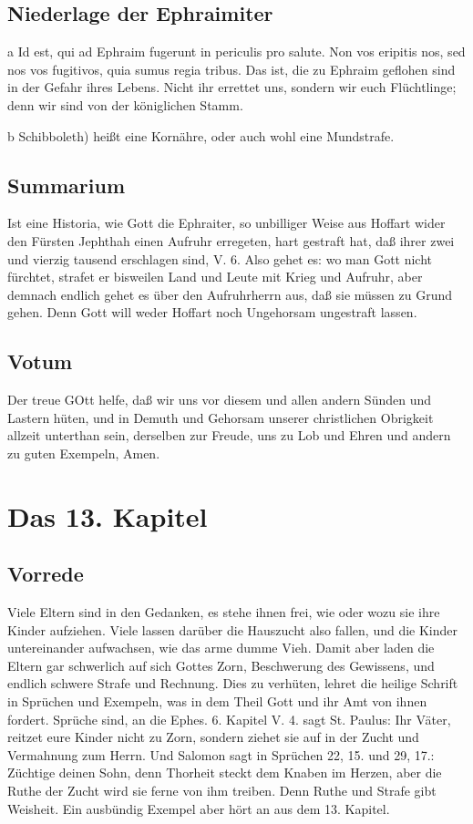 \section{Niederlage der Ephraimiter}

a Id est, qui ad Ephraim fugerunt in periculis pro salute. Non vos eripitis nos, sed nos vos fugitivos, quia sumus regia tribus. Das ist, die zu Ephraim geflohen sind in der Gefahr ihres Lebens. Nicht ihr errettet uns, sondern wir euch Flüchtlinge; denn wir sind von der königlichen Stamm.

b Schibboleth) heißt eine Kornähre, oder auch wohl eine Mundstrafe.

\section{Summarium}

Ist eine Historia, wie Gott die Ephraiter, so unbilliger Weise aus Hoffart wider den Fürsten Jephthah einen Aufruhr erregeten, hart gestraft hat, daß ihrer zwei und vierzig tausend erschlagen sind, V. 6. Also gehet es: wo man Gott nicht fürchtet, strafet er bisweilen Land und Leute mit Krieg und Aufruhr, aber demnach endlich gehet es über den Aufruhrherrn aus, daß sie müssen zu Grund gehen. Denn Gott will weder Hoffart noch Ungehorsam ungestraft lassen.

\section{Votum}

Der treue GOtt helfe, daß wir uns vor diesem und allen andern Sünden und Lastern hüten, und in Demuth und Gehorsam unserer christlichen Obrigkeit allzeit unterthan sein, derselben zur Freude, uns zu Lob und Ehren und andern zu guten Exempeln, Amen.
\chapter{Das 13. Kapitel}

\section{Vorrede}

Viele Eltern sind in den Gedanken, es stehe ihnen frei, wie oder wozu sie ihre Kinder aufziehen. Viele lassen darüber die Hauszucht also fallen, und die Kinder untereinander aufwachsen, wie das arme dumme Vieh. Damit aber laden die Eltern gar schwerlich auf sich Gottes Zorn, Beschwerung des Gewissens, und endlich schwere Strafe und Rechnung. Dies zu verhüten, lehret die heilige Schrift in Sprüchen und Exempeln, was in dem Theil Gott und ihr Amt von ihnen fordert. Sprüche sind, an die Ephes. 6. Kapitel V. 4. sagt St. Paulus: Ihr Väter, reitzet eure Kinder nicht zu Zorn, sondern ziehet sie auf in der Zucht und Vermahnung zum Herrn. Und Salomon sagt in Sprüchen 22, 15. und 29, 17.: Züchtige deinen Sohn, denn Thorheit steckt dem Knaben im Herzen, aber die Ruthe der Zucht wird sie ferne von ihm treiben. Denn Ruthe und Strafe gibt Weisheit. Ein ausbündig Exempel aber hört an aus dem 13. Kapitel.

